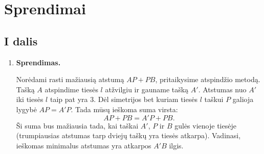 \documentclass[11pt,a4paper]{article}
\begin{document}
\newpage
\section*{Sprendimai}

\subsection*{I dalis}
\begin{enumerate}
    \item \textbf{Sprendimas.}
    
    Norėdami rasti mažiausią atstumą $AP + PB$, pritaikysime atspindžio metodą. Tašką $A$ atspindime tiesės $l$ atžvilgiu ir gauname tašką $A'$. Atstumas nuo $A'$ iki tiesės $l$ taip pat yra 3.
    Dėl simetrijos bet kuriam tiesės $l$ taškui $P$ galioja lygybė $AP = A'P$. Tada mūsų ieškoma suma virsta:
    \[ AP + PB = A'P + PB. \]
    Ši suma bus mažiausia tada, kai taškai $A'$, $P$ ir $B$ gulės vienoje tiesėje (trumpiausias atstumas tarp dviejų taškų yra tiesės atkarpa). Vadinasi, ieškomas minimalus atstumas yra atkarpos $A'B$ ilgis.
    
    \begin{center}
\end{center}
\end{enumerate}
\end{document}
